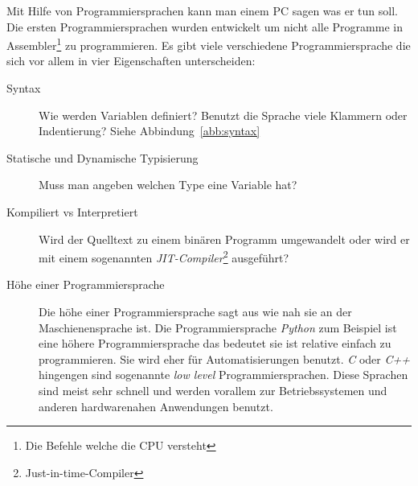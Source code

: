 \documentclass[a4paper, ngerman, 12pt]{scrartcl}
\begin{document}
Mit Hilfe von Programmiersprachen kann man einem PC sagen was er tun soll.
Die ersten Programmiersprachen wurden entwickelt um nicht alle Programme in Assembler\footnote{Die Befehle welche die CPU versteht} zu programmieren.
Es gibt viele verschiedene Programmiersprache die sich vor allem in vier Eigenschaften unterscheiden:

\begin{description}
	\item[Syntax] Wie werden Variablen definiert? Benutzt die Sprache viele Klammern oder Indentierung? Siehe Abbindung~\ref{abb:syntax}
	\item[Statische und Dynamische Typisierung] Muss man angeben welchen Type eine Variable hat?
	\item[Kompiliert vs Interpretiert] Wird der Quelltext zu einem binären Programm umgewandelt oder wird er mit einem sogenannten \textit{JIT-Compiler}\footnote{Just-in-time-Compiler} ausgeführt?
	\item[Höhe einer Programmiersprache] Die höhe einer Programmiersprache sagt aus wie nah sie an der Maschienensprache ist. Die Programmiersprache \emph{Python} zum Beispiel ist eine höhere Programmiersprache das bedeutet sie ist relative einfach zu programmieren. Sie wird eher für Automatisierungen benutzt. \emph{C} oder \emph{C++} hingengen sind sogenannte \emph{low level} Programmiersprachen. Diese Sprachen sind meist sehr schnell und werden vorallem zur Betriebssystemen und anderen hardwarenahen Anwendungen benutzt.
\end{description}
\end{document}

